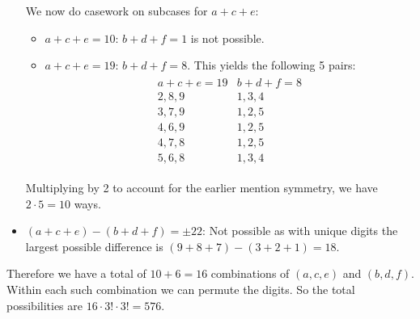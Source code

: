 \documentclass[11pt,twoside]{scrartcl}
\begin{document}
\begin{problem}
\begin{sketch}
\begin{itemize}
            We now do casework on subcases for $a+c+e$:
            \begin{itemize}
                \item $a+c+e = 10$: $b+d+f =1$ is not possible.
                \item $a+c+e = 19$: $b+d+f =8$. This yields the following 5 pairs:
                \begin{align*}
                    \begin{array}{c|c}
                        a+c+e=19 & b+d+f=8 \\ \hline
                        2,8,9 & 1,3,4 \\
                        3,7,9 & 1,2,5 \\
                        4,6,9 & 1,2,5 \\
                        4,7,8 & 1,2,5 \\
                        5,6,8 & 1,3,4
                    \end{array}   
                \end{align*}
            \end{itemize}
            Multiplying by 2 to account for the earlier mention symmetry, we have $2\cdot5=10$ ways.
            \item $(a+c+e)-(b+d+f) = \pm 22$: Not possible as with unique digits the largest possible difference is $(9+8+7)-(3+2+1) = 18$. 
        \end{itemize}
        Therefore we have a total of $10+6 = 16$ combinations of $(a,c,e)$ and $(b,d,f)$. Within each such combination we can permute the digits. So the total possibilities are $ 16 \cdot 3! \cdot 3! = \boxed{576}.$
    \end{sketch}
\end{problem}
\end{document}
